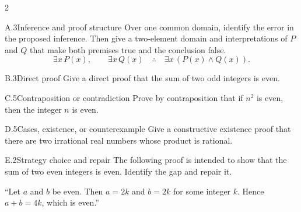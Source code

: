 \documentclass[9pt]{extarticle}
\begin{document}
\begin{multicols}{2}
\begin{CoreProblem}{A.3}{Inference and proof structure}
Over one common domain, identify the error in the proposed inference. Then give
a two-element domain and interpretations of $P$ and $Q$ that make both premises
true and the conclusion false.
\[
\exists x\,P(x),\qquad \exists x\,Q(x)
\quad\therefore\quad
\exists x\,(P(x)\land Q(x)).
\]
\end{CoreProblem}
\begin{CoreProblem}{B.3}{Direct proof}
Give a direct proof that the sum of two odd integers is even.
\end{CoreProblem}
\begin{CoreProblem}{C.5}{Contraposition or contradiction}
Prove by contraposition that if $n^2$ is even, then the integer $n$ is even.
\end{CoreProblem}
\columnbreak
\begin{CoreProblem}{D.5}{Cases, existence, or counterexample}
Give a constructive existence proof that there are two irrational real numbers
whose product is rational.
\end{CoreProblem}
\begin{CoreProblem}{E.2}{Strategy choice and repair}
The following proof is intended to show that the sum of two even integers is even. Identify the gap and repair it.

``Let $a$ and $b$ be even. Then $a=2k$ and $b=2k$ for some integer $k$. Hence $a+b=4k$, which is even.''
\end{CoreProblem}
\end{multicols}
\CoreWorkArea
\FormBreak
{}
\end{document}
